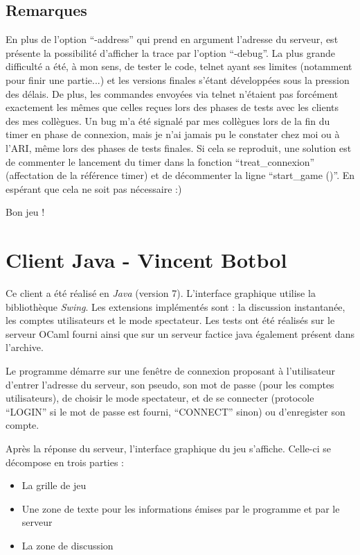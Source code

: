 \documentclass[a4paper, 11pt]{report}
\begin{document}
\section{Remarques}

En plus de l'option ``-address'' qui prend en argument l'adresse du serveur, est présente la possibilité d'afficher la trace par l'option ``-debug''.
\medskip
La plus grande difficulté a été, à mon sens, de tester le code, telnet ayant ses limites (notamment pour finir une partie...) et les versions finales s'étant développées sous la pression des délais. De plus, les commandes envoyées via telnet n'étaient pas forcément exactement les mêmes que celles reçues lors des phases de tests avec les clients des mes collègues.
\medskip
Un bug m'a été signalé par mes collègues lors de la fin du timer en phase de connexion, mais je n'ai jamais pu le constater chez moi ou à l'ARI, même lors des phases de tests finales. Si cela se reproduit, une solution est de commenter le lancement du timer dans la fonction ``treat\_connexion'' (affectation de la référence timer) et de décommenter la ligne ``start\_game ()''. En espérant que cela ne soit pas nécessaire :)
\bigskip

Bon jeu !

\chapter{Client Java - Vincent Botbol}

Ce client a été réalisé en \emph{Java} (version 7). L'interface graphique utilise
la bibliothèque \emph{Swing}. Les extensions implémentés sont : la discussion instantanée,
les comptes utilisateurs et le mode spectateur. Les tests ont été réalisés sur le serveur OCaml
fourni ainsi que sur un serveur factice java également présent dans l'archive.

Le programme démarre sur une fenêtre de connexion proposant à l'utilisateur d'entrer
l'adresse du serveur, son pseudo, son mot de passe (pour les comptes utilisateurs), de choisir
le mode spectateur, et de se connecter (protocole ``LOGIN'' si le mot de passe est fourni, ``CONNECT'' sinon) ou d'enregister son compte.

Après la réponse du serveur, l'interface graphique du jeu s'affiche. Celle-ci se décompose en
trois parties :
\begin{itemize}
  \item La grille de jeu
  \item Une zone de texte pour les informations émises par le programme et par le serveur
  \item La zone de discussion
\end{itemize}\medskip{}
\end{document}
